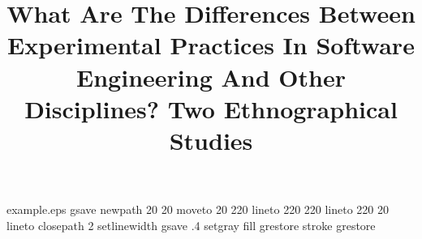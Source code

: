 %
%
%
%
%
\begin{filecontents*}{example.eps}
gsave
newpath
  20 20 moveto
  20 220 lineto
  220 220 lineto
  220 20 lineto
closepath
2 setlinewidth
gsave
  .4 setgray fill
grestore
stroke
grestore
\end{filecontents*}
%
\RequirePackage{fix-cm}
%
\documentclass[twocolumn]{svjour3}          %
%
\smartqed  %
%
\usepackage{graphicx}
%
%
%
\usepackage{graphicx}
\usepackage{tabulary}
\usepackage{multirow}
\usepackage{enumerate}
\usepackage{hyperref}
\usepackage{color}
\usepackage{soul}
\usepackage[latin1]{inputenc}
\usepackage{comment}
\usepackage{rotating}
\usepackage{framed}

\newcommand{\rodrinote}[1]{\textcolor{blue}{[RODRI:#1]}}

%
%


\title{What Are The Differences Between Experimental Practices In Software Engineering And Other Disciplines? Two Ethnographical Studies}


